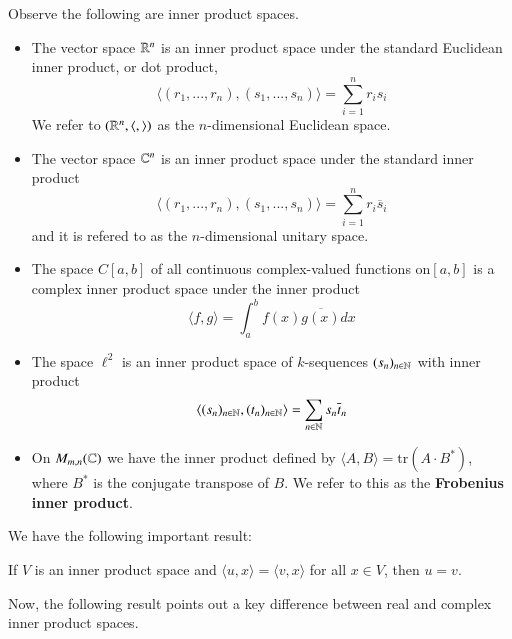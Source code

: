 \begin{example}
    Observe the following are inner product spaces. \begin{itemize}
        \item The vector space $\mathbb R^n$ is an inner product space under the standard Euclidean inner product, or dot product, \begin{equation*}
                \langle (r_1,...,r_n),(s_1,...,s_n)\rangle = \sum_{i=1}^nr_is_i
        \end{equation*}
            We refer to $(\mathbb R^n,\langle,\rangle)$ as the $n$-dimensional Euclidean space.
        \item The vector space $\mathbb C^n$ is an inner product space under the standard inner product \begin{equation*}
                \langle (r_1,...,r_n),(s_1,...,s_n)\rangle = \sum_{i=1}^nr_i\overline{s}_i
        \end{equation*}
            and it is refered to as the $n$-dimensional unitary space.
        \item The space $C[a,b]$ of all continuous complex-valued functions on$[a,b]$ is a complex inner product space under the inner product \begin{equation*}
                \langle f,g\rangle = \int_a^bf(x)\overline{g(x)}dx
        \end{equation*}
        \item The space $\ell^2$ is an inner product space of $k$-sequences $(s_n)_{n\in \mathbb N}$ with inner product \begin{equation*}
                \langle(s_n)_{n\in\mathbb N},(t_n)_{n\in\mathbb N}\rangle = \sum_{n\in \mathbb N}s_n\overline{t}_n
        \end{equation*}
        \item On $M_{m,n}(\mathbb C)$ we have the inner product defined by $\langle A,B\rangle = \text{tr}(A\cdot B^*)$, where $B^*$ is the conjugate transpose of $B$. We refer to this as the \textbf{Frobenius inner product}.
    \end{itemize}
\end{example}

We have the following important result:

\begin{lemma}
    If $V$ is an inner product space and $\langle u,x\rangle = \langle v,x\rangle$ for all $x \in V$, then $u=v$.
\end{lemma}

Now, the following result points out a key difference between real and complex inner product spaces.

